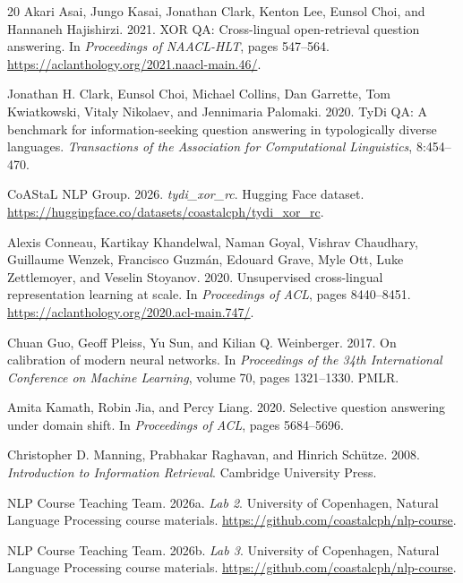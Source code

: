 \documentclass[11pt]{article}
\begin{document}
\clearpage
\begin{thebibliography}{20}
Akari Asai, Jungo Kasai, Jonathan Clark, Kenton Lee, Eunsol Choi, and Hannaneh Hajishirzi. 2021. XOR QA: Cross-lingual open-retrieval question answering. In \textit{Proceedings of NAACL-HLT}, pages 547--564. \url{https://aclanthology.org/2021.naacl-main.46/}.

Jonathan H. Clark, Eunsol Choi, Michael Collins, Dan Garrette, Tom Kwiatkowski, Vitaly Nikolaev, and Jennimaria Palomaki. 2020. TyDi QA: A benchmark for information-seeking question answering in typologically diverse languages. \textit{Transactions of the Association for Computational Linguistics}, 8:454--470.

CoAStaL NLP Group. 2026. \textit{tydi\_xor\_rc}. Hugging Face dataset. \url{https://huggingface.co/datasets/coastalcph/tydi_xor_rc}.

Alexis Conneau, Kartikay Khandelwal, Naman Goyal, Vishrav Chaudhary, Guillaume Wenzek, Francisco Guzm\'an, Edouard Grave, Myle Ott, Luke Zettlemoyer, and Veselin Stoyanov. 2020. Unsupervised cross-lingual representation learning at scale. In \textit{Proceedings of ACL}, pages 8440--8451. \url{https://aclanthology.org/2020.acl-main.747/}.

Chuan Guo, Geoff Pleiss, Yu Sun, and Kilian Q. Weinberger. 2017. On calibration of modern neural networks. In \textit{Proceedings of the 34th International Conference on Machine Learning}, volume 70, pages 1321--1330. PMLR.

Amita Kamath, Robin Jia, and Percy Liang. 2020. Selective question answering under domain shift. In \textit{Proceedings of ACL}, pages 5684--5696.

Christopher D. Manning, Prabhakar Raghavan, and Hinrich Sch\"utze. 2008. \textit{Introduction to Information Retrieval}. Cambridge University Press.

NLP Course Teaching Team. 2026a. \textit{Lab 2}. University of Copenhagen, Natural Language Processing course materials. \url{https://github.com/coastalcph/nlp-course}.

NLP Course Teaching Team. 2026b. \textit{Lab 3}. University of Copenhagen, Natural Language Processing course materials. \url{https://github.com/coastalcph/nlp-course}.


\end{thebibliography}
\end{document}
